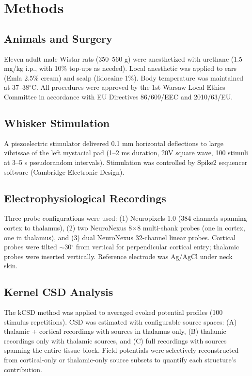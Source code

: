 \documentclass[11pt]{article}
\begin{document}
\section{Methods}

\subsection{Animals and Surgery}

Eleven adult male Wistar rats (350--560 g) were anesthetized with urethane (1.5 mg/kg i.p., with 10\% top-ups as needed). Local anesthetic was applied to ears (Emla 2.5\% cream) and scalp (lidocaine 1\%). Body temperature was maintained at 37--38$^{\circ}$C. All procedures were approved by the 1st Warsaw Local Ethics Committee in accordance with EU Directives 86/609/EEC and 2010/63/EU.

\subsection{Whisker Stimulation}

A piezoelectric stimulator delivered 0.1 mm horizontal deflections to large vibrissae of the left mystacial pad (1--2 ms duration, 20V square wave, 100 stimuli at 3--5 s pseudorandom intervals). Stimulation was controlled by Spike2 sequencer software (Cambridge Electronic Design).

\subsection{Electrophysiological Recordings}

Three probe configurations were used: (1) Neuropixels 1.0 (384 channels spanning cortex to thalamus), (2) two NeuroNexus 8$\times$8 multi-shank probes (one in cortex, one in thalamus), and (3) dual NeuroNexus 32-channel linear probes. Cortical probes were tilted $\sim$30$^{\circ}$ from vertical for perpendicular cortical entry; thalamic probes were inserted vertically. Reference electrode was Ag/AgCl under neck skin.

\subsection{Kernel CSD Analysis}

The kCSD method \citep{potworowski2012} was applied to averaged evoked potential profiles (100 stimulus repetitions). CSD was estimated with configurable source spaces: (A) thalamic + cortical recordings with sources in thalamus only, (B) thalamic recordings only with thalamic sources, and (C) full recordings with sources spanning the entire tissue block. Field potentials were selectively reconstructed from cortical-only or thalamic-only source subsets to quantify each structure's contribution.
\end{document}
